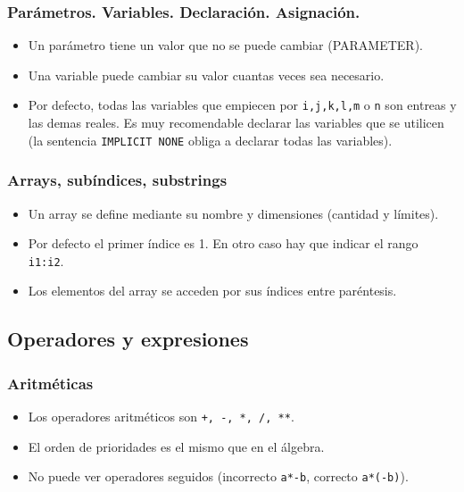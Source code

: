 \subsubsection{Parámetros. Variables. Declaración. Asignación.}

\begin{itemize}
	\item Un parámetro tiene un valor que no se puede cambiar (PARAMETER).
	\item Una variable puede cambiar su valor cuantas veces sea necesario.
	\item Por defecto, todas las variables que empiecen por \texttt{i,j,k,l,m} o \texttt{n} son entreas y las demas reales. Es muy recomendable declarar las variables que se utilicen (la sentencia {\tt IMPLICIT NONE} obliga a declarar todas las variables).
\end{itemize}

\subsubsection{Arrays, subíndices, substrings}

\begin{itemize}
	\item Un array se define mediante su nombre y dimensiones (cantidad y límites).
	\item Por defecto el primer índice es 1. En otro caso hay que indicar el rango {\tt i1:i2}.
	\item Los elementos del array se acceden por sus índices entre paréntesis.
\end{itemize}



\subsection{Operadores y expresiones}

\subsubsection{Aritméticas}

\begin{itemize}
	\item Los operadores aritméticos son {\tt +, -, *, /, **}.
	\item El orden de prioridades es el mismo que en el álgebra.
	\item No puede ver operadores seguidos (incorrecto {\tt a*-b}, correcto {\tt a*(-b)}).
\end{itemize}

